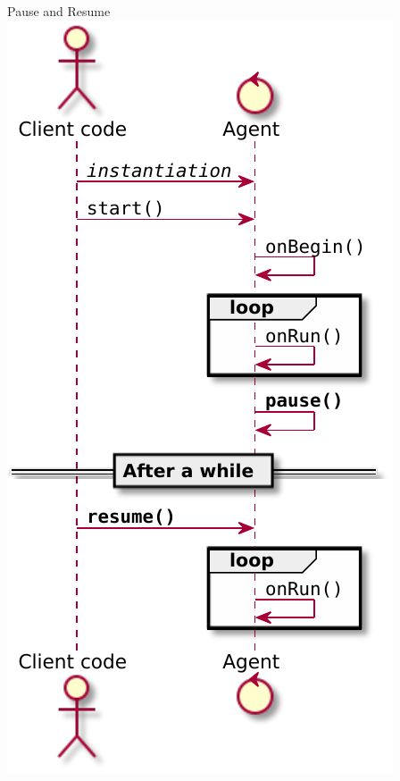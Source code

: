 \documentclass[presentation]{beamer}\mode<presentation>{\usetheme{AMSCesenaPurpleAndGold}}
\begin{document}
\begin{frame}{Pause and Resume}\centering
    \includegraphics[height=.8\textheight]{img/paused-flow.pdf}
\end{frame}
\end{document}
